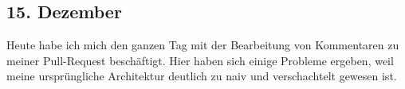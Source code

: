 \subsection{15. Dezember}
Heute habe ich mich den ganzen Tag mit der Bearbeitung von Kommentaren zu meiner Pull-Request beschäftigt. Hier haben sich einige Probleme ergeben, weil meine ursprüngliche Architektur deutlich zu naiv und verschachtelt gewesen ist.